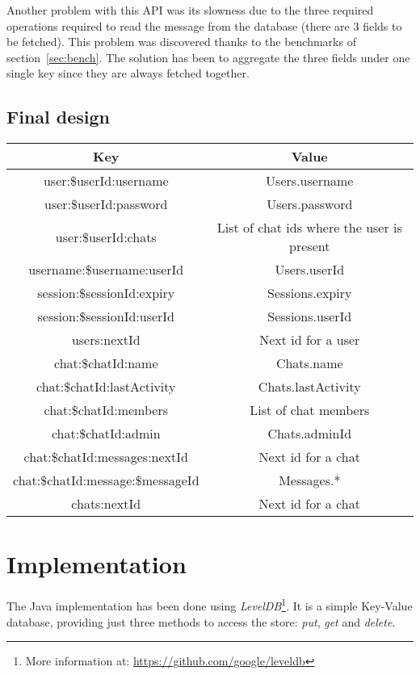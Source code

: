 \documentclass[10pt]{article}
\begin{document}
Another problem with this API was its slowness due to the three required 
operations required to read the message from the database (there are 
3 fields to be fetched). This problem was discovered thanks to the benchmarks
of section~\ref{sec:bench}. The solution has been to aggregate the three fields 
under one single key since they are always fetched together.

\subsection{Final design}
\begin{center}
\begin{tabular}{ | c | c | }
    \hline
    \textbf{Key} & \textbf{Value} \\\hline
    user:\$userId:username & Users.username \\\hline
    user:\$userId:password & Users.password \\\hline
    user:\$userId:chats & List of chat ids where the user is present \\\hline
    username:\$username:userId & Users.userId \\\hline
    session:\$sessionId:expiry & Sessions.expiry \\\hline
    session:\$sessionId:userId & Sessions.userId \\\hline
    users:nextId & Next id for a user \\\hline
    chat:\$chatId:name & Chats.name \\\hline
    chat:\$chatId:lastActivity & Chats.lastActivity \\\hline
    chat:\$chatId:members & List of chat members \\\hline
    chat:\$chatId:admin & Chats.adminId\\\hline
    chat:\$chatId:messages:nextId & Next id for a chat \\\hline
    chat:\$chatId:message:\$messageId & Messages.* \\\hline
    chats:nextId & Next id for a chat \\\hline
\end{tabular}
\end{center}

\section{Implementation}
The Java implementation has been done using \emph{LevelDB}\footnote{More information
at: \url{https://github.com/google/leveldb}}. It is a simple Key-Value database, 
providing just three methods to access the store: \emph{put}, \emph{get} and 
\emph{delete}.
\end{document}
